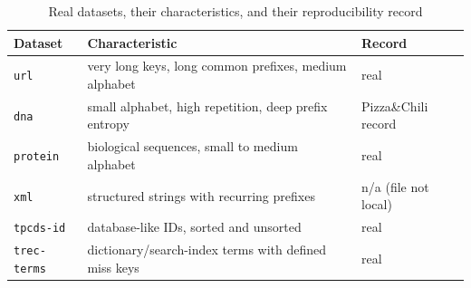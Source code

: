 \begin{table}[!htbp]
  \centering\small
  \caption{Real datasets, their characteristics, and their reproducibility record}\label{tab:datasets}
  \begin{tabular}{lll}
    \toprule
    \textbf{Dataset} & \textbf{Characteristic} & \textbf{Record} \\
    \midrule
    \texttt{url} & very long keys, long common prefixes, medium alphabet & real \\
    \texttt{dna} & small alphabet, high repetition, deep prefix entropy & Pizza\&Chili record \\
    \texttt{protein} & biological sequences, small to medium alphabet & real \\
    \texttt{xml} & structured strings with recurring prefixes & n/a (file not local) \\
    \texttt{tpcds-id} & database-like IDs, sorted and unsorted & real \\
    \texttt{trec-terms} & dictionary/search-index terms with defined miss keys & real \\
    \bottomrule
  \end{tabular}
\end{table}

